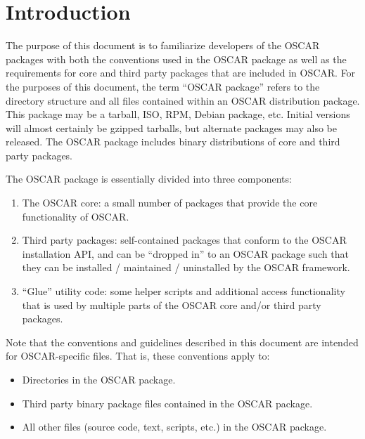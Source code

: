 %
%
%

\section{Introduction}

The purpose of this document is to familiarize developers of the OSCAR
packages with both the conventions used in the OSCAR package as well
as the requirements for core and third party packages that are
included in OSCAR.  For the purposes of this document, the term
``OSCAR package'' refers to the directory structure and all files
contained within an OSCAR distribution package.  This package may be a
tarball, ISO, RPM, Debian package, etc.  Initial versions will almost
certainly be gzipped tarballs, but alternate packages may also be
released.  The OSCAR package includes binary distributions of core and
third party packages.

The OSCAR package is essentially divided into three components:

\begin{enumerate}
\item The OSCAR core: a small number of packages that provide the core
  functionality of OSCAR.
  
\item Third party packages: self-contained packages that conform to
  the OSCAR installation API, and can be ``dropped in'' to an OSCAR
  package such that they can be installed / maintained / uninstalled
  by the OSCAR framework.

\item ``Glue'' utility code: some helper scripts and additional
  access functionality that is used by multiple parts of the OSCAR
  core and/or third party packages.
\end{enumerate}

Note that the conventions and guidelines described in this document
are intended for OSCAR-specific files.  That is, these conventions
apply to:

\begin{itemize}
\item Directories in the OSCAR package.
\item Third party binary package files contained in the OSCAR package.
\item All other files (source code, text, scripts, etc.) in the OSCAR
  package.
\end{itemize}

